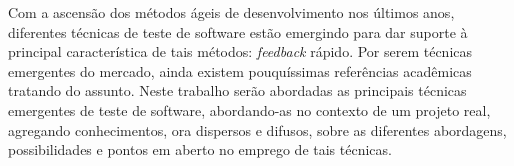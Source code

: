 \documentclass[a4paper,         %
	           abntfigtabnum,
	           noindentfirst,
	           normaltoc,
	           pnumplain,
	           notimes
]{abnt}
\begin{document}


\capa
\folhaderosto


\setlength{\ABNTsignthickness}{0.4pt}
\setlength{\ABNTsignskip}{3cm}









\listoffigures
\listoftables

\begin{resumo}
Com a ascensão dos métodos ágeis de desenvolvimento nos últimos anos, diferentes técnicas de teste de software estão emergindo para dar suporte à principal característica de tais métodos: \textit{feedback} rápido. Por serem técnicas emergentes do mercado, ainda existem pouquíssimas referências acadêmicas tratando do assunto. Neste trabalho serão abordadas as principais técnicas emergentes de teste de software, abordando-as no contexto de um projeto real, agregando conhecimentos, ora dispersos e difusos, sobre as diferentes abordagens, possibilidades e pontos em aberto no emprego de tais técnicas.
\end{resumo}
\end{document}
